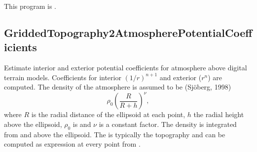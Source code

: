 This program is .
\clearpage
\subsection{GriddedTopography2AtmospherePotentialCoefficients}\label{GriddedTopography2AtmospherePotentialCoefficients}
Estimate interior and exterior potential coefficients for atmosphere above digital terrain models.
Coefficients for interior $(1/r)^{n+1}$ and exterior ($r^n$) are computed.
The density of the atmosphere is assumed to be (Sjöberg, 1998)
\begin{equation}
\rho_0\left(\frac{R}{R+h}\right)^\nu,
\end{equation}
where $R$ is the radial distance of the ellipsoid at each point, $h$ the radial height above the ellipsoid,
$\rho_0$ is  and  $\nu$ is a constant factor. The density is integrated
from  and  above the ellipsoid.
The  is typically the topography and can be computed as expression at every point
from .


